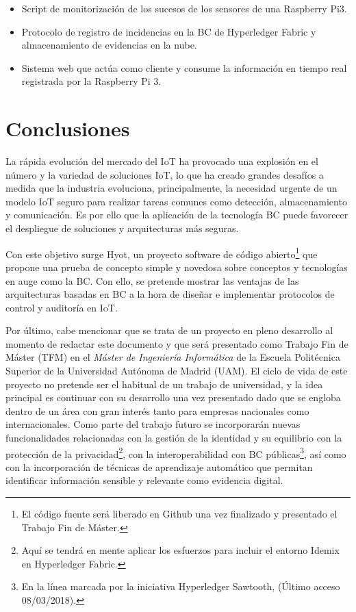 \documentclass[10pt,conference,a4paper]{IEEEtran}
\begin{document}
\begin{itemize}
  \item Script de monitorización de los sucesos de los sensores de una
    Raspberry Pi3.
  \item Protocolo de registro de incidencias en la BC de Hyperledger
    Fabric y almacenamiento de evidencias en la nube. 
  \item Sistema web que actúa como cliente y consume la
          información en tiempo real registrada por la Raspberry Pi 3.
\end{itemize}

\section{Conclusiones}

La rápida evolución del mercado del IoT ha provocado una explosión en
el número y la variedad de soluciones IoT, lo que ha creado grandes
desafíos a medida que la industria evoluciona, principalmente, la
necesidad urgente de un modelo IoT seguro para realizar tareas comunes
como detección, almacenamiento y comunicación. Es por ello que la
aplicación de la tecnología BC puede favorecer el despliegue de
soluciones y arquitecturas más seguras.

Con este objetivo surge Hyot, un proyecto software de código
abierto\footnote{El código fuente será liberado en Github una vez
  finalizado y presentado el Trabajo Fin de Máster.} que propone una
prueba de concepto simple y novedosa sobre conceptos y tecnologías en
auge como la BC. Con ello, se pretende mostrar las ventajas de las
arquitecturas basadas en BC a la hora de diseñar e implementar
protocolos de control y auditoría en IoT.

Por último, cabe mencionar que se trata de un proyecto en pleno
desarrollo al momento de redactar este documento y que será presentado
como Trabajo Fin de Máster (TFM) en el \textit{Máster de Ingeniería
  Informática} de la Escuela Politécnica Superior de la Universidad
Autónoma de Madrid (UAM). El ciclo de vida de este proyecto no pretende ser el
habitual de un trabajo de universidad, y la idea principal es continuar
con su desarrollo una vez presentado dado que se engloba dentro de un
área con  gran interés tanto para empresas nacionales como
internacionales. Como parte del trabajo futuro se incorporarán nuevas
funcionalidades relacionadas con la gestión de la identidad y su
equilibrio con la protección de la privacidad\footnote{Aquí se tendrá
  en mente aplicar los esfuerzos para incluir el entorno Idemix en
  Hyperledger Fabric.}, con la interoperabilidad con BC
públicas\footnote{En la línea marcada por la iniciativa Hyperledger
  Sawtooth, \cite{sawtooth:url}
  (Último acceso 08/03/2018).}, así como con la incorporación de técnicas de
aprendizaje automático  que permitan identificar información sensible
y relevante como evidencia digital. 
 
\end{document}
